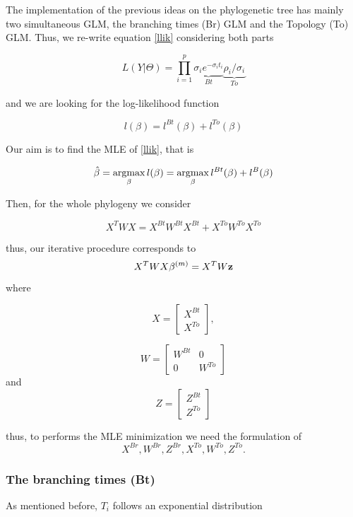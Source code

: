 The implementation of the previous ideas on the phylogenetic tree has mainly two simultaneous GLM, the branching times (Br) GLM and the Topology (To) GLM. Thus, we re-write equation \ref{llik} considering both parts
 
 		\begin{equation} L( Y | \Theta) = \displaystyle\prod_{i=1}^p \displaystyle\underbrace{\sigma_i e^{-\sigma_i t_i}}_{Bt} \displaystyle\underbrace{\rho_i / \sigma_i}_{To}  
 		\label{llik2}
 		\end{equation}
 		
and we are looking for the log-likelihood function

$$ l(\beta) = l^{Bt}(\beta) + l^{To}(\beta) $$
 		
 Our aim is to find the MLE of \ref{llik}, that is
 
 
 $$ \hat{\beta} = \displaystyle\argmax_{\beta} l(\beta) = \displaystyle\argmax_{\beta} l^{Bt}(\beta) + l^B(\beta)$$ 
 
 
Then, for the whole phylogeny we consider 

$$X^TWX = X^{Bt}W^{Bt}X^{Bt} + X^{To}W^{To}X^{To} $$
 
thus, our iterative procedure corresponds to 
\begin{equation}
  X^T W X\beta^{(m)}=X^TW\bf{z}
  \label{iter}
\end{equation}
 where
 
 \[
X=
  \begin{bmatrix}
    X^{Bt} \\
   X^{To}
  \end{bmatrix},
\]

\[
W =
  \begin{bmatrix}
    W^{Bt}   &  0 \\
    0 &  W^{To} 
  \end{bmatrix}
\]
and 
  \[
Z=
  \begin{bmatrix}
    Z^{Bt} \\
   Z^{To}
  \end{bmatrix}
\]


thus, to performs the MLE minimization we need the formulation of $$X^{Br}, W^{Br}, Z^{Br}, X^{To}, W^{To}, Z^{To}.$$  

\subsubsection*{The branching times (Bt)}
	
As mentioned before, $T_i$ follows an exponential distribution 
	
